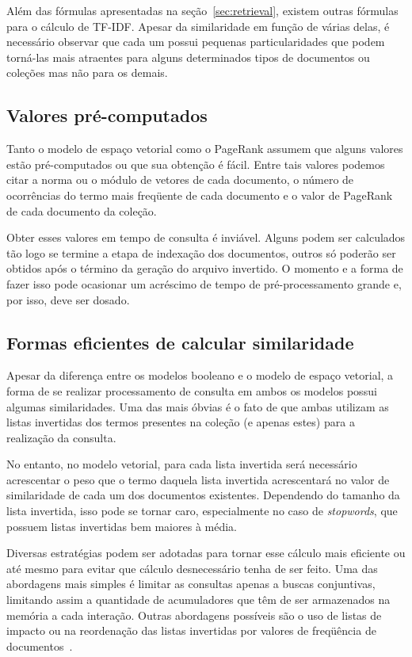 \documentclass[10pt,twocolumn]{article}
\begin{document}
Além das fórmulas apresentadas na seção~\ref{sec:retrieval}, existem
outras fórmulas para o cálculo de TF-IDF. Apesar da similaridade em
função de várias delas, é necessário observar que cada um possui
pequenas particularidades que podem torná-las mais atraentes para alguns
determinados tipos de documentos ou coleções mas não para os demais.

\subsection{Valores pré-computados}

Tanto o modelo de espaço vetorial como o PageRank assumem que alguns
valores estão pré-computados ou que sua obtenção é fácil. Entre tais
valores podemos citar a norma ou o módulo de vetores de cada documento,
o número de ocorrências do termo mais freqüente de cada documento e o valor de
PageRank de cada documento da coleção.

Obter esses valores em tempo de consulta é inviável. Alguns podem ser
calculados tão logo se termine a etapa de indexação dos
documentos, outros só poderão ser obtidos após o término da geração do
arquivo invertido. O momento e a forma de fazer isso pode ocasionar um
acréscimo de tempo de pré-processamento grande e, por isso, deve ser
dosado.

\subsection{Formas eficientes de calcular similaridade}

Apesar da diferença entre os modelos booleano e o modelo de espaço
vetorial, a forma de se realizar processamento de consulta em ambos os
modelos possui algumas similaridades. Uma das mais óbvias é o fato de
que ambas utilizam as listas invertidas dos termos presentes na coleção
(e apenas estes) para a realização da consulta.

No entanto, no modelo vetorial, para cada lista invertida será
necessário acrescentar o peso que o termo daquela lista invertida
acrescentará no valor de similaridade de cada um dos documentos
existentes. Dependendo do tamanho da lista invertida, isso pode se
tornar caro, especialmente no caso de \emph{stopwords}, que possuem
listas invertidas bem maiores à média.

Diversas estratégias podem ser adotadas para tornar esse cálculo mais
eficiente ou até mesmo para evitar que cálculo desnecessário tenha de
ser feito. Uma das abordagens mais simples é limitar as consultas apenas
a buscas conjuntivas, limitando assim a quantidade de acumuladores que
têm de ser armazenados na memória a cada interação. Outras abordagens
possíveis são o uso de listas de impacto ou na reordenação das
listas invertidas por valores de freqüência de
documentos~\cite{moffat1999managing, persin1996frequency}.
\end{document}
